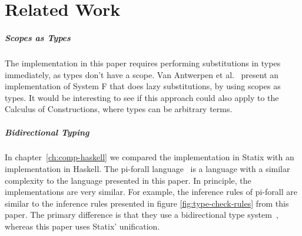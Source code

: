 \chapter{Related Work}
\label{ch:relatedwork}

\paragraph{Scopes as Types}

The implementation in this paper requires performing substitutions in types immediately, as types don't have a scope. Van Antwerpen et al.~\cite[sect 2.5]{scopes_as_types} present an implementation of System F that does lazy substitutions, by using scopes as types. It would be interesting to see if this approach could also apply to the Calculus of Constructions, where types can be arbitrary terms. 

\paragraph{Bidirectional Typing}

In chapter~\ref{ch:comp-haskell} we compared the implementation in Statix with an implementation in Haskell. The pi-forall language~\cite{pi_forall} is a language with a similar complexity to the language presented in this paper. In principle, the implementations are very similar. For example, the inference rules of pi-forall are similar to the inference rules presented in figure \ref{fig:type-check-rules} from this paper. The primary difference is that they use a bidirectional type system~\cite{bidirectional}, whereas this paper uses Statix' unification.

\paragraph{}